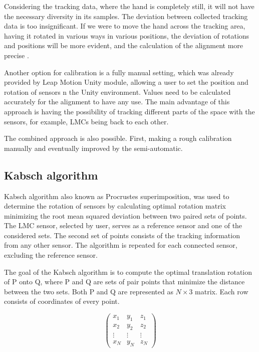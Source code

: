 Considering the tracking data, where the hand is completely still, it will not have the necessary diversity in its samples. The deviation between collected tracking data is too insignificant. If we were to move the hand across the tracking area, having it rotated in various ways in various positions, the deviation of rotations and positions will be more evident, and the calculation of the alignment more precise \cite{tomasMultileap}.

Another option for calibration is a fully manual setting, which was already provided by Leap Motion Unity module, allowing a user to set the position and rotation of sensors n the Unity environment. Values need to be calculated accurately for the alignment to have any use. The main advantage of this approach is having the possibility of tracking different parts of the space with the sensors, for example, LMCs being back to each other.

The combined approach is also possible. First, making a rough calibration manually and eventually improved by the semi-automatic.

\subsection{Kabsch algorithm}

Kabsch algorithm \cite{kabsch} also known as Procrustes superimposition, was used to determine the rotation of sensors by calculating optimal rotation matrix minimizing the root mean squared deviation between two paired sets of points. The LMC sensor, selected by user, serves as a reference sensor and one of the considered sets. The second set of points consists of the tracking information from any other sensor. The algorithm is repeated for each connected sensor, excluding the reference sensor.

The goal of the Kabsch algorithm is to compute the optimal translation rotation of P onto Q, where P and Q are sets of pair points that minimize the distance between the two sets. Both P and Q are represented as $N \times 3$ matrix. Each row consists of coordinates of every point.

\begin{equation}
    \begin{pmatrix}
        x_1 & y_1 & z_1\\
        x_2 & y_2 & z_2\\
        \vdots & \vdots & \vdots\\
        x_N & y_N & z_N
    \end{pmatrix}
\end{equation}

